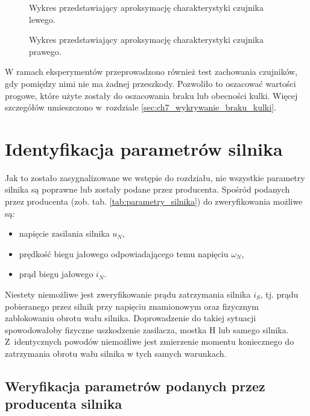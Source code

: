 \begin{figure}[h]
    \centering
    
    \caption{Wykres przedstawiający aproksymację charakterystyki czujnika lewego.}
    \label{fig:aproksymacja_czujnika_lewego}
\end{figure}

\begin{figure}[H]
    \centering
    
    \caption{Wykres przedstawiający aproksymację charakterystyki czujnika prawego.}
    \label{fig:aproksymacja_czujnika_prawego}
\end{figure}

W ramach eksperymentów przeprowadzono również test zachowania czujników, gdy pomiędzy nimi nie ma żadnej przeszkody. Pozwoliło to oszacować wartości progowe, które użyte zostały do oszacowania braku lub obecności kulki. Więcej szczegółów umieszczono w~rozdziale \ref{sec:ch7_wykrywanie_braku_kulki}.

\section{Identyfikacja parametrów silnika}
\label{sec:ch5_identyfikacja_parametrow_silnika}

Jak to zostało zasygnalizowane we wstępie do rozdziału, nie wszystkie parametry silnika są poprawne lub zostały podane przez producenta. Spośród podanych przez producenta (zob. tab. \ref{tab:parametry_silnika}) do zweryfikowania możliwe są:

\begin{itemize}
    \item napięcie zasilania silnika $u_N$,
    \item prędkość biegu jałowego odpowiadającego temu napięciu $\omega_N$,
    \item prąd biegu jałowego $i_N$.
\end{itemize}

Niestety niemożliwe jest zweryfikowanie prądu zatrzymania silnika $i_S$, tj. prądu pobieranego przez silnik przy napięciu znamionowym oraz fizycznym zablokowaniu obrotu wału silnika. Doprowadzenie do takiej sytuacji spowodowałoby fizyczne uszkodzenie zasilacza, mostka H lub samego silnika. Z~identycznych powodów niemożliwe jest zmierzenie momentu koniecznego do zatrzymania obrotu wału silnika w tych samych warunkach.

\subsection{Weryfikacja parametrów podanych przez producenta silnika}
\label{subsec:ch5_weryfikacja_parametrow_producenta_silnika}

